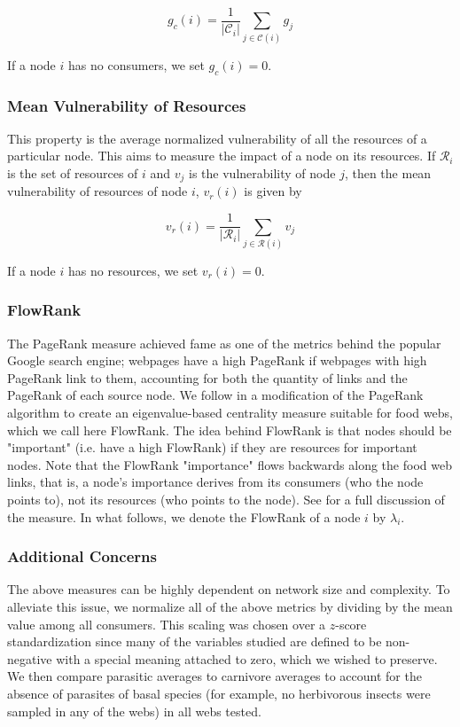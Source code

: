 \documentclass[../dissertation.tex]{subfiles}
\begin{document}
\begin{equation} 
    g_c(i) = \frac{1}{|\mathcal{C}_i|}\sum_{j\in\mathcal{C}(i)}g_j
\label{eq:MeanGeneralityConsumers} 
\end{equation}

If a node $i$ has no consumers, we set $g_c(i)=0$. 


\subsubsection{Mean Vulnerability of Resources} This property is the average
normalized vulnerability of all the resources of a particular node. This aims
to measure the impact of a node on its resources. If $\mathcal{R}_i$ is the
set of resources of $i$ and $v_j$ is the vulnerability of node $j$, then the
mean vulnerability of resources of node $i$, $v_r(i)$ is given by

\begin{equation} 
    v_r(i) = \frac{1}{|\mathcal{R}_i|}\sum_{j\in\mathcal{R}(i)}v_j
\label{eq:MeanVulnerabilityResources}  
\end{equation}

If a node $i$ has no resources, we set $v_r(i)=0$.

\newcommand\FR{\mathit{FR}} 

\subsubsection{FlowRank} The PageRank measure achieved fame as one of the
metrics behind the popular Google search engine; webpages have a high PageRank
if webpages with high PageRank link to them, accounting for both the quantity
of links and the PageRank of each source node.  We follow \cite{Allesina2009b}
in a modification of the PageRank algorithm to create an eigenvalue-based
centrality measure suitable for food webs, which we call here FlowRank. The
idea behind FlowRank is that nodes should be "important" (i.e. have a high
FlowRank) if they are resources for important nodes. Note that the FlowRank
"importance" flows backwards along the food web links, that is, a node's
importance derives from its consumers (who the node points to), not its resources
(who points to the node). See \cite{Allesina2009b} for a full discussion of the
measure. In what follows, we denote the FlowRank of a node $i$ by
$\lambda_i$.

\subsubsection{Additional Concerns} The above measures can be highly dependent
on network size and complexity. To alleviate this issue, we normalize all of
the above metrics by dividing by the mean value among all consumers. This
scaling was chosen over a $z$-score standardization since many of the variables
studied are defined to be non-negative with a special meaning attached to zero,
which we wished to preserve. We then compare parasitic averages to carnivore
averages to account for the absence of parasites of basal species (for example,
no herbivorous insects were sampled in any of the webs) in all webs
tested.
\end{document}
